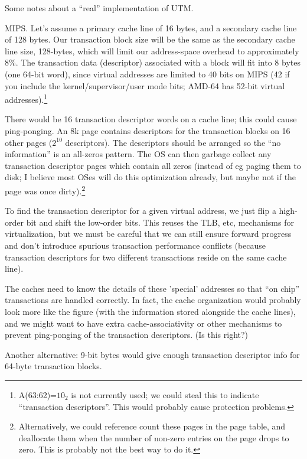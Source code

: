 Some notes about a ``real'' implementation of UTM.

MIPS.  Let's assume a primary cache line of 16 bytes, and a secondary
cache line of 128 bytes.  Our transaction block size will be the same
as the secondary cache line size, 128-bytes, which will limit our
address-space overhead to approximately 8\%.  The transaction data (descriptor)
associated with a block will fit into 8 bytes (one 64-bit word), since
virtual addresses are limited to 40 bits on MIPS (42 if you include
the kernel/supervisor/user mode bits; AMD-64 has 52-bit virtual
addresses).\footnote{A(63:62)=$10_2$ is not currently used; we could
steal this to indicate ``transaction descriptors''.  This would probably
cause protection problems.}

There would be 16 transaction descriptor words on a cache line; this
could cause ping-ponging.  An 8k page contains descriptors for the
transaction blocks on 16 other pages ($2^10$ descriptors).  The
descriptors should be arranged so the ``no information'' is an
all-zeros pattern.  The OS can then garbage collect any transaction
descriptor pages which contain all zeros (instead of eg paging them to
disk; I believe most OSes will do this optimization already, but maybe
not if the page was once dirty).\footnote{Alternatively, we could reference
count these pages in the page table, and deallocate them when the
number of non-zero entries on the page drops to zero.  This is
probably not the best way to do it.}

To find the transaction descriptor for a given virtual address, we
just flip a high-order bit and shift the low-order bits.  This reuses
the TLB, etc, mechanisms for virtualization, but we must be careful
that we can still ensure forward progress and don't introduce spurious
transaction performance conflicts (because transaction descriptors for
two different transactions reside on the same cache line).

The caches need to know the details of these 'special' addresses so
that ``on chip'' transactions are handled correctly.  In fact, the
cache organization would probably look more like the figure (with the
information stored alongside the cache lines), and we might want to
have extra cache-associativity or other mechanisms to prevent
ping-ponging of the transaction descriptors. (Is this right?)


Another alternative: 9-bit bytes would give enough transaction
descriptor info for 64-byte transaction blocks.
